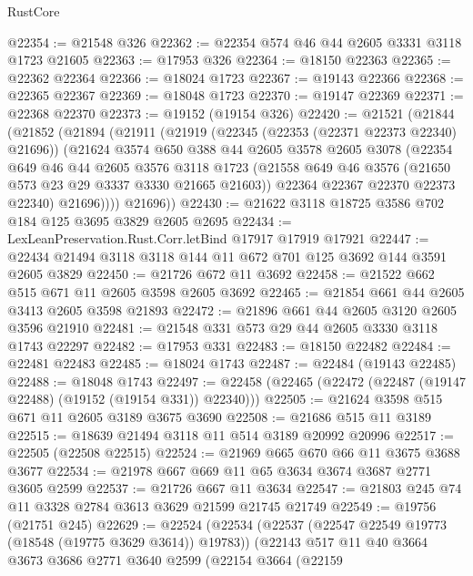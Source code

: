 \begin{lexlean}{RustCore}
\begin{coremodule}
@22354 := @21548 @326
@22362 := @22354 @574 @46 @44 @2605 @3331 @3118 @1723 @21605
@22363 := @17953 @326
@22364 := @18150 @22363
@22365 := @22362 @22364
@22366 := @18024 @1723
@22367 := @19143 @22366
@22368 := @22365 @22367
@22369 := @18048 @1723
@22370 := @19147 @22369
@22371 := @22368 @22370
@22373 := @19152 (@19154 @326)
@22420 := @21521
    (@21844
      (@21852
        (@21894
          (@21911
            (@21919
              (@22345 (@22353 (@22371 @22373 @22340) @21696))
              (@21624
                @3574
                @650
                @388
                @44
                @2605
                @3578
                @2605
                @3078
                (@22354
                  @649
                  @46
                  @44
                  @2605
                  @3576
                  @3118
                  @1723
                  (@21558 @649 @46 @3576 (@21650 @573 @23 @29 @3337 @3330 @21665 @21603))
                  @22364
                  @22367
                  @22370
                  @22373
                  @22340)
                @21696))))
        @21696))
@22430 := @21622 @3118 @18725 @3586 @702 @184 @125 @3695 @3829 @2605 @2695
@22434 := LexLeanPreservation.Rust.Corr.letBind @17917 @17919 @17921
@22447 := @22434 @21494 @3118 @3118 @144 @11 @672 @701 @125 @3692 @144 @3591 @2605 @3829
@22450 := @21726 @672 @11 @3692
@22458 := @21522 @662 @515 @671 @11 @2605 @3598 @2605 @3692
@22465 := @21854 @661 @44 @2605 @3413 @2605 @3598 @21893
@22472 := @21896 @661 @44 @2605 @3120 @2605 @3596 @21910
@22481 := @21548 @331 @573 @29 @44 @2605 @3330 @3118 @1743 @22297
@22482 := @17953 @331
@22483 := @18150 @22482
@22484 := @22481 @22483
@22485 := @18024 @1743
@22487 := @22484 (@19143 @22485)
@22488 := @18048 @1743
@22497 := @22458 (@22465 (@22472 (@22487 (@19147 @22488) (@19152 (@19154 @331)) @22340)))
@22505 := @21624 @3598 @515 @671 @11 @2605 @3189 @3675 @3690
@22508 := @21686 @515 @11 @3189
@22515 := @18639 @21494 @3118 @11 @514 @3189 @20992 @20996
@22517 := @22505 (@22508 @22515)
@22524 := @21969 @665 @670 @66 @11 @3675 @3688 @3677
@22534 := @21978 @667 @669 @11 @65 @3634 @3674 @3687 @2771 @3605 @2599
@22537 := @21726 @667 @11 @3634
@22547 := @21803 @245 @74 @11 @3328 @2784 @3613 @3629 @21599 @21745 @21749
@22549 := @19756 (@21751 @245)
@22629 := @22524
    (@22534
      (@22537 (@22547 @22549 @19773 (@18548 (@19775 @3629 @3614)) @19783))
      (@22143
        @517
        @11
        @40
        @3664
        @3673
        @3686
        @2771
        @3640
        @2599
        (@22154
          @3664
          (@22159

\end{coremodule}
\end{lexlean}
